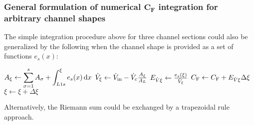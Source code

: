 \subsubsection*{General formulation of numerical $\boldsymbol{C_\text{F}}$ integration for arbitrary 
  channel shapes}
\vspace*{-.5ex}
The simple integration procedure above for three channel sections could also be generalized by the following when the 
channel shape is provided as a set of functions $e_s(x)$:
\begin{algorithmic}
  \State $A_\xi \leftarrow \displaystyle\sum_{\sigma=1}^{s}A_\sigma + \displaystyle\int_{L1s}^\xi e_s(x) \mathop{}\!\mathrm{d} x $
  \State $ \dot{V}_\xi \leftarrow \dot{V}_\text{in} - \dot{V}_\text{c} \frac{A_\xi}{A_L} $ 
  \State $E_{\dot{V}\xi} \leftarrow \frac{e_s(\xi)}{\dot{V}_\xi} $
  \State $C_\text{F} \leftarrow C_\text{F} + E_{\dot{V}\xi} \Delta\xi $
  \State $\xi \leftarrow \xi + \Delta\xi $
  \EndWhile
  \EndFor
\end{algorithmic}
\vspace*{-0.5ex}
Alternatively, the Riemann sum could be exchanged by a trapezoidal rule approach.
\needspace{30em}
